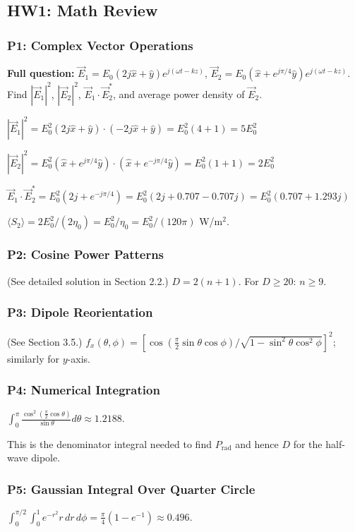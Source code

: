 \documentclass[10pt,letterpaper]{article}
\newcommand{\vE}{\vec{E}}
\newcommand{\xhat}{\hat{x}}
\newcommand{\yhat}{\hat{y}}
\begin{document}
\subsection{HW1: Math Review}

\subsubsection{P1: Complex Vector Operations}
\textbf{Full question:} $\vE_1 = E_0(2j\xhat+\yhat)e^{j(\omega t-kz)}$, $\vE_2 = E_0(\xhat+e^{j\pi/4}\yhat)e^{j(\omega t-kz)}$. Find $|\vE_1|^2$, $|\vE_2|^2$, $\vE_1\cdot\vE_2^*$, and average power density of $\vE_2$.

$|\vE_1|^2 = E_0^2(2j\xhat+\yhat)\cdot(-2j\xhat+\yhat) = E_0^2(4+1) = 5E_0^2$

$|\vE_2|^2 = E_0^2(\xhat+e^{j\pi/4}\yhat)\cdot(\xhat+e^{-j\pi/4}\yhat) = E_0^2(1+1) = 2E_0^2$

$\vE_1\cdot\vE_2^* = E_0^2(2j+e^{-j\pi/4}) = E_0^2(2j + 0.707 - 0.707j) = E_0^2(0.707 + 1.293j)$

$\langle S_2\rangle = 2E_0^2/(2\eta_0) = E_0^2/\eta_0 = E_0^2/(120\pi)$ W/m$^2$.

\subsubsection{P2: Cosine Power Patterns}
(See detailed solution in Section 2.2.) $D = 2(n+1)$. For $D\geq20$: $n\geq9$.

\subsubsection{P3: Dipole Reorientation}
(See Section 3.5.) $f_x(\theta,\phi) = \left[\cos(\frac\pi2\sin\theta\cos\phi)/\sqrt{1-\sin^2\theta\cos^2\phi}\right]^2$; similarly for $y$-axis.

\subsubsection{P4: Numerical Integration}
$\int_0^\pi\frac{\cos^2(\frac\pi2\cos\theta)}{\sin\theta}d\theta \approx 1.2188$.

This is the denominator integral needed to find $P_\mathrm{rad}$ and hence $D$ for the half-wave dipole.

\subsubsection{P5: Gaussian Integral Over Quarter Circle}
$\int_0^{\pi/2}\int_0^1 e^{-r^2}r\,dr\,d\phi = \frac\pi4(1-e^{-1})\approx 0.496$.
\end{document}

